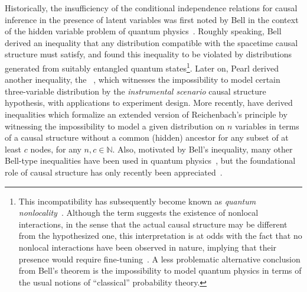 Historically, the insufficiency of the conditional independence relations for causal inference in the presence of latent variables was first noted by Bell in the context of the hidden variable problem of quantum physics~\cite{bell1964einstein}. Roughly speaking, Bell derived an inequality that any distribution compatible with the spacetime causal structure must satisfy, and found this inequality to be violated by distributions generated from suitably entangled quantum states\footnote{This incompatibility has subsequently become known as \emph{quantum nonlocality}~\cite{Brunner2013Bell}. Although the term suggests the existence of nonlocal interactions, in the sense that the actual causal structure may be different from the hypothesized one, this interpretation is at odds with the fact that no nonlocal interactions have been observed in nature, implying that their presence would require fine-tuning~\cite{WoodSpekkens}. A less problematic alternative conclusion from Bell's theorem is the impossibility to model quantum physics in terms of the usual notions of ``classical'' probability theory.}. Later on, Pearl derived another inequality, the ~\cite{pearl1995instrumental}, which witnesses the impossibility to model certain three-variable distribution by the \emph{instrumental scenario} causal structure hypothesis, with applications to experiment design. More recently, \citet{steudel2010ancestors} have derived inequalities which formalize an extended version of Reichenbach's principle by witnessing the impossibility to model a given distribution on $n$ variables in terms of a causal structure without a common (hidden) ancestor for any subset of at least $c$ nodes, for any $n,c\in\mathbb{N}$. Also, motivated by Bell's inequality, many other Bell-type inequalities have been used in quantum physics~\cite{Brunner2013Bell}, but the foundational role of causal structure has only recently been appreciated~\cite{WoodSpekkens,fritz2012bell,pusey2014gdag,BeyondBellII}.



